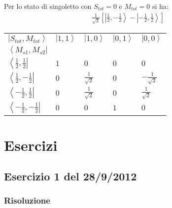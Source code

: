 Per lo stato di singoletto con $S_{tot}=0$ e $M_{tot}=0$ si ha:
\begin{equation}\begin{split}
\frac{1}{\sqrt{2}}\left[\left |\frac{1}{2},-\frac{1}{2} \right\rangle -\left |-\frac{1}{2},\frac{1}{2} \right\rangle \right]
\end{split}\end{equation}

\begin{tabularx}{\textwidth}{XXXXX}
\toprule
$\left | S_{tot},M_{tot}\right\rangle$ & $\left |1,1 \right\rangle$ & $\left |1,0 \right\rangle$ & $\left |0,1 \right\rangle$ & $\left |0,0 \right\rangle$ \\
$\left\langle M_{s1},M_{s2}\right |$ &&&&\\
\midrule
$\left\langle \frac{1}{2},\frac{1}{2}\right |$ & $1$ & $0$ & $0$ & $0$ \\
$\left\langle \frac{1}{2},-\frac{1}{2}\right |$ & $0$ & $\frac{1}{\sqrt{2}}$ & $0$ & $-\frac{1}{\sqrt{2}}$ \\
$\left\langle -\frac{1}{2},\frac{1}{2}\right |$ & $0$ & $\frac{1}{\sqrt{2}}$ & $0$ & $\frac{1}{\sqrt{2}}$ \\
$\left\langle -\frac{1}{2},-\frac{1}{2}\right |$ & $0$ & $0$ & $1$ & $0$ \\
\bottomrule
\end{tabularx}

\chapter{Esercizi} %
\section{Esercizio 1 del 28/9/2012} %
\subsection{Risoluzione} %

